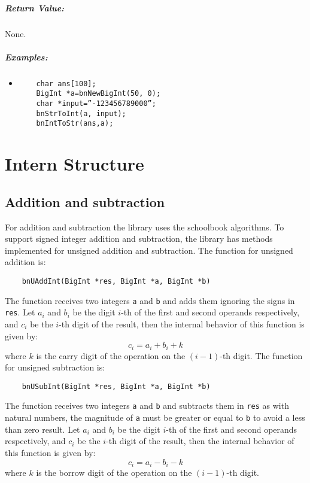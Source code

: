 \documentclass{book}
\begin{document}
\paragraph{Return Value:}

None.

\paragraph{Examples:}

\begin{itemize}
\item

\begin{verbatim}
	char ans[100];
	BigInt *a=bnNewBigInt(50, 0);
	char *input=”-123456789000”;
	bnStrToInt(a, input);
	bnIntToStr(ans,a);
\end{verbatim}
\end{itemize}


\chapter{Intern Structure}

\section{Addition and subtraction}
For addition and subtraction the library uses the schoolbook algorithms. To support signed integer addition and subtraction, the library has methods implemented for unsigned addition and subtraction. The function for unsigned addition is:
    \begin{verbatim}
    bnUAddInt(BigInt *res, BigInt *a, BigInt *b)
    \end{verbatim}
The function receives two integers \verb+a+ and \verb+b+ and adds them ignoring the signs in \verb+res+. Let $a_i$ and $b_i$ be the digit $i$-th of the first and second operands respectively, and $c_i$ be the $i$-th digit of the result, then the internal behavior of this function is given by:
\[c_i = a_i + b_i + k \]
where $k$ is the carry digit of the operation on the $(i-1)$-th digit. The function for unsigned subtraction is:
    \begin{verbatim}
    bnUSubInt(BigInt *res, BigInt *a, BigInt *b)
    \end{verbatim}
The function receives two integers \verb+a+ and \verb+b+ and subtracts them in \verb+res+ as with natural numbers, the magnitude of \verb+a+ must be greater or equal to \verb+b+ to avoid a less than zero result. Let $a_i$ and $b_i$ be the digit $i$-th of the first and second operands respectively, and $c_i$ be the $i$-th digit of the result, then the internal behavior of this function is given by:
\[c_i = a_i - b_i - k \]
where $k$ is the borrow digit of the operation on the $(i-1)$-th digit. \\
\end{document}
